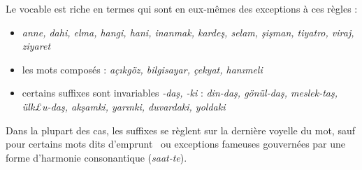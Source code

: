 \documentclass{cours}
\newcommand{\ch}{\c{s}}
\begin{document}
Le vocable est riche en termes qui sont en eux-mêmes des exceptions à ces règles :
\begin{itemize}
    \item \textsl{anne, dahi, elma, hangi, hani, inanmak, karde\ch, selam, \ch i\ch man, tiyatro, viraj, ziyaret}
    \item les mots composés : \textsl{aç\i kgöz, bilgisayar, çekyat, han\i meli}
    \item certains suffixes sont invariables {\sl -da\ch, -ki} : \textsl{din-da\ch, gönül-da\ch, meslek-ta\ch, ülk£u-da\ch, ak\ch amki, yar\i nki, duvardaki, yoldaki}
\end{itemize}
Dans la plupart des cas, les suffixes se règlent sur la dernière voyelle du mot, sauf pour certains mots dits \og d'emprunt \fg\ ou exceptions fameuses gouvernées par une forme d'harmonie consonantique ({\sl saat-te}).
\end{document}
